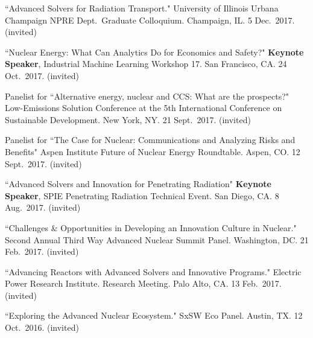\begin{bibsection}
\item ``Advanced Solvers for Radiation Transport." University of Illinois Urbana Champaign NPRE Dept.\ Graduate Colloquium. Champaign, IL. 5 Dec.\ 2017. (invited)


\item ``Nuclear Energy: What Can Analytics Do for Economics and Safety?" \textbf{Keynote Speaker}, Industrial Machine Learning Workshop 17. San Francisco, CA. 24 Oct.\ 2017. (invited)

\item Panelist for ``Alternative energy, nuclear and CCS: What are the prospects?" Low-Emissions Solution Conference at the 5th International Conference on Sustainable Development. New York, NY. 21  Sept.\ 2017. (invited)

\item Panelist for ``The Case for Nuclear: Communications and Analyzing Risks and Benefits" Aspen Institute Future of Nuclear Energy Roundtable. Aspen, CO. 12  Sept.\ 2017. (invited)

\item ``Advanced Solvers and Innovation for Penetrating Radiation" \textbf{Keynote Speaker}, SPIE Penetrating Radiation Technical Event. San Diego, CA. 8 Aug.\ 2017. (invited)


\item ``Challenges \& Opportunities in Developing an Innovation Culture in Nuclear." Second Annual Third Way Advanced Nuclear Summit Panel. Washington, DC. 21 Feb.\ 2017. (invited)

\item ``Advancing Reactors with Advanced Solvers and Innovative Programs." Electric Power Research Institute. Research Meeting. Palo Alto, CA. 13 Feb.\ 2017. (invited)

\item ``Exploring the Advanced Nuclear Ecosystem." SxSW Eco Panel. Austin, TX. 12 Oct.\ 2016. (invited)



\end{bibsection}
